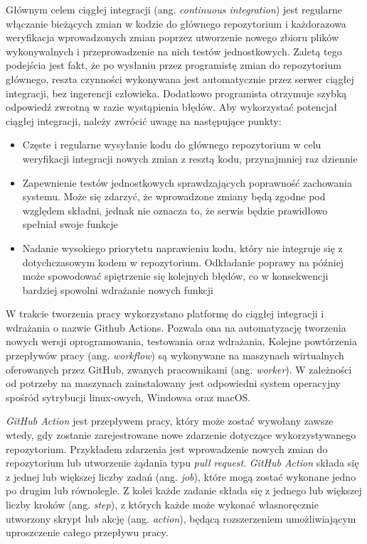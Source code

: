 Głównym celem ciągłej integracji (ang. \textit{continuous integration}) jest regularne włączanie 
bieżących zmian w kodzie do głównego repozytorium i każdorazowa weryfikacja 
wprowadzonych zmian poprzez utworzenie nowego zbioru plików wykonywalnych 
i przeprowadzenie na nich testów jednostkowych. Zaletą tego podejścia jest fakt, że 
po wysłaniu przez programistę zmian do repozytorium głównego, reszta czynności 
wykonywana jest automatycznie przez serwer ciągłej integracji, bez ingerencji 
człowieka. Dodatkowo programista otrzymuje szybką odpowiedź zwrotną w razie 
wystąpienia błędów.
Aby wykorzystać potencjał ciągłej integracji, należy zwrócić uwagę na następujące 
punkty: 

\begin{itemize} %
    \item Częste i regularne wysyłanie kodu do głównego repozytorium w celu weryfikacji 
    integracji nowych zmian z resztą kodu, przynajmniej raz dziennie 
    \item Zapewnienie testów jednostkowych sprawdzających poprawność zachowania systemu. 
    Może się zdarzyć, że wprowadzone zmiany będą zgodne pod względem 
    składni, jednak nie oznacza to, że serwis będzie prawidłowo spełniał swoje 
    funkcje 
    \item Nadanie wysokiego priorytetu naprawieniu kodu, który nie integruje się z 
    dotychczasowym kodem w repozytorium. Odkładanie poprawy na później może spowodować 
    spiętrzenie się kolejnych błędów, co w konsekwencji bardziej spowolni wdrażanie 
    nowych funkcji
\end{itemize}

W trakcie tworzenia pracy wykorzystano platformę do ciągłej integracji i wdrażania 
o nazwie Github Actions. Pozwala ona na automatyzację tworzenia nowych wersji 
oprogramowania, testowania oraz wdrażania. Kolejne powtórzenia przepływów pracy 
(ang. \textit{workflow}) są wykonywane na maszynach wirtualnych oferowanych przez 
GitHub, zwanych pracownikami (ang. \textit{worker}). W zależności od potrzeby na maszynach 
zainstalowany jest odpowiedni system operacyjny spośród sytrybucji 
linux-owych, Windowsa oraz macOS.

\textit{GitHub Action} jest przepływem pracy, który może zostać wywołany zawsze wtedy, gdy 
zostanie zarejestrowane nowe zdarzenie dotyczące wykorzystywanego repozytorium. 
Przykładem zdarzenia jest wprowadzenie nowych zmian do repozytorium lub utworzenie 
żądania typu \textit{pull request}. \textit{GitHub Action} składa się z jednej lub większej liczby 
zadań (ang. \textit{job}), które mogą zostać wykonane jedno po drugim lub równolegle. Z kolei 
każde zadanie składa się z jednego lub większej liczby kroków (ang. \textit{step}), z których 
każde może wykonać własnoręcznie utworzony skrypt lub akcję (ang. \textit{action}), będącą 
rozszerzeniem umożliwiającym uproszczenie całego przepływu pracy.

